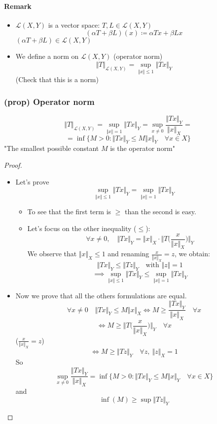 \paragraph{Remark}
\begin{itemize}
    \item $\mathcal L(X,Y)$ is a vector space: $T,L\in \mathcal L(X,Y)$
    $$(\alpha T+\beta L)(x)\coloneqq \alpha Tx+\beta Lx$$
    $(\alpha T+\beta L)\in\mathcal L(X,Y)$
    \item We define a norm on $\mathcal L(X,Y)$ (operator norm)
    $$\Vert T\Vert_{\mathcal L(X,Y)}=\sup_{\Vert x\Vert \leq 1}\Vert Tx\Vert _Y$$
    (Check that this is a norm)
\end{itemize}
\subsubsection{(prop) Operator norm}
$$\Vert T\Vert_{\mathcal L(X,Y)}=\sup_{\Vert x\Vert =1}\Vert Tx\Vert_Y=\sup_{x\neq 0}\frac{\Vert Tx\Vert _Y}{\Vert x\Vert _X}=$$
$$=\inf\Big\{M>0:\Vert Tx\Vert_Y\leq M\Vert x\Vert _Y\quad \forall x\in X\Big\}$$
"The smallest possible constant $M$ is the operator norm"
\begin{proof}\ 
\begin{itemize}
    \item Let's prove $$\sup_{\Vert x\Vert \leq 1}\Vert Tx\Vert _Y=\sup_{\Vert x\Vert =1}\Vert Tx\Vert_Y$$
    \begin{itemize}
        \item To see that the first term is $\geq$ than the second is easy.
        \item Let's focus on the other inequality ($\leq$):
            $$\forall x\neq 0,\quad \Vert Tx\Vert_Y=\Vert x\Vert_X\cdot \Big\Vert T\Big(\frac{x}{\Vert x\Vert_X}\Big )\Big\Vert_Y$$
            We observe that $\Vert x\Vert_X\leq 1$ and renaming $\frac x{\Vert x\Vert _X}=z$, we obtain:
            $$\Vert Tx\Vert_Y\leq \Vert Tz\Vert_Y\quad \text{with }\Vert z\Vert=1$$
            $$\implies \sup_{\Vert x\Vert \leq 1}\Vert Tx\Vert _Y\leq\sup_{\Vert x\Vert =1}\Vert Tx\Vert_Y$$
    \end{itemize}
    \item Now we prove that all the others formulations are equal.
    $$\forall x\neq 0 \quad \Vert Tx\Vert _Y\leq M\Vert x\Vert_X\iff M\geq \frac{\Vert Tx\Vert _Y}{\Vert x\Vert_X}\quad \forall x$$
    $$\iff M\geq \Big\Vert T\Big(\frac{x}{\Vert x\Vert_X}\Big)\Big\Vert_Y\quad \forall x$$
    ($\frac x{\Vert x\Vert_X}=z$)
    $$\iff M\geq \Vert Tz\Vert _Y\quad \forall z,\ \Vert z\Vert_X=1$$
    So 
    $$\sup_{x\neq 0}\frac{\Vert Tx\Vert _Y}{\Vert x\Vert _X}=\inf\Big\{M>0:\Vert Tx\Vert_Y\leq M\Vert x\Vert _Y\quad \forall x\in X\Big\}$$
    and $$\inf (M)\geq \sup\Vert Tz\Vert_Y$$
\end{itemize}
    
\end{proof}
